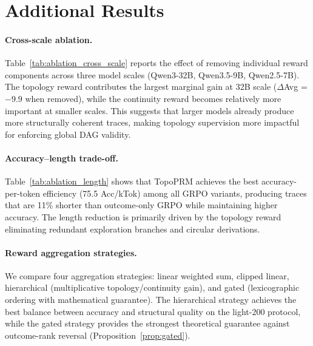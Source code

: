 \section{Additional Results}
\label{app:additional}

\paragraph{Cross-scale ablation.}
Table~\ref{tab:ablation_cross_scale} reports the effect of removing individual reward components across three model scales (Qwen3-32B, Qwen3.5-9B, Qwen2.5-7B).
The topology reward contributes the largest marginal gain at 32B scale ($\Delta$Avg = $-9.9$ when removed), while the continuity reward becomes relatively more important at smaller scales.
This suggests that larger models already produce more structurally coherent traces, making topology supervision more impactful for enforcing global DAG validity.

\paragraph{Accuracy--length trade-off.}
Table~\ref{tab:ablation_length} shows that TopoPRM achieves the best accuracy-per-token efficiency (75.5 Acc/kTok) among all GRPO variants, producing traces that are 11\% shorter than outcome-only GRPO while maintaining higher accuracy.
The length reduction is primarily driven by the topology reward eliminating redundant exploration branches and circular derivations.

\paragraph{Reward aggregation strategies.}
We compare four aggregation strategies: linear weighted sum, clipped linear, hierarchical (multiplicative topology/continuity gain), and gated (lexicographic ordering with mathematical guarantee).
The hierarchical strategy achieves the best balance between accuracy and structural quality on the light-200 protocol, while the gated strategy provides the strongest theoretical guarantee against outcome-rank reversal (Proposition~\ref{prop:gated}).
